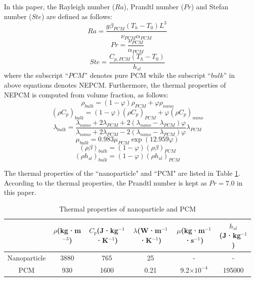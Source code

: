 \documentclass[preprint,12pt]{elsarticle}
\begin{document}
In this paper, the Rayleigh number ($Ra$), Prandtl number ($Pr$) and Stefan number ($Ste$) are defined as follows:
\begin{equation}
	Ra = \frac{{g\beta_{PCM} \left( {T_h - {T_0}} \right){L^3}}}{{\nu_{PCM} \alpha_{PCM} }}
\end{equation}
\begin{equation}
	Pr=\frac{\nu_{PCM}}{\alpha_{PCM}}
\end{equation}
\begin{equation}
	Ste=\frac{C_{p,PCM}(T_h-T_0)}{h_{sl}}
\end{equation}
where the subscript $ “PCM” $ denotes pure PCM while the subscript “$bulk$” in above equations denotes NEPCM. Furthermore, the thermal properties of NEPCM is computed from volume fraction, as follows\cite{RN1173,RN1065,RN1174}:
\begin{equation}
	{\rho _{bulk}} = \left( {1 - \varphi } \right){\rho _{PCM}} + \varphi {\rho _{nano}}
\end{equation}
\begin{equation}
	{\left( {\rho {C_p}} \right)_{bulk}} = \left( {1 - \varphi } \right){\left( {\rho {C_p}} \right)_{PCM}} + \varphi {\left( {\rho {C_p}} \right)_{nano}}
\end{equation}
\begin{equation}
	{\lambda _{bulk}} = \frac
	{\lambda _{nano} + 2\lambda _{PCM} + 2\left( \lambda _{nano}- \lambda _{PCM} \right)\varphi }
	{\lambda _{nano} + 2\lambda _{PCM} - 2\left( \lambda _{nano} - \lambda _{PCM} \right)\varphi }
	\lambda _{PCM}
\end{equation}
\begin{equation}
	{\mu _{bulk}} = 0.983{\mu _{PCM}}\exp \left( {12.959\varphi } \right)
\end{equation}
\begin{equation}
	{\left( {\rho \beta } \right)_{bulk}} = \left( {1 - \varphi } \right){\left( {\rho \beta } \right)_{PCM}}
\end{equation}
\begin{equation}
	{\left( {\rho h_{sl} } \right)_{bulk}} = \left( {1 - \varphi } \right){\left( {\rho h_{sl} } \right)_{PCM}}
\end{equation}
	    
	The thermal properties of the ``nanoparticle" and ``PCM" are listed in Table \ref{Thermal_Properties}. According to the thermal properties, the Prandtl number is kept as $Pr=7.0$ in this paper.
	
	\begin{table}[H]
		\centering
		\footnotesize
		\caption{Thermal properties of nanoparticle and PCM}
		\begin{tabular}{cccccc}
			\toprule
			& $\rho$(kg·m$^{-3}$) & $C_p$(J·kg$^{-1}$·K$^{-1}$) & $\lambda$(W·m$^{-1}$·K$^{-1}$) & $\mu$(kg·m$^{-1}$·s$^{-1}$) & $h_{sl}$(J·kg$^{-1}$) \\
			\midrule
			Nanoparticle & 3880 & 765  & 25   & -      & - \\
			PCM          & 930  & 1600 & 0.21 & 9.2$\times10^{-4}$ & 195000 \\
			\bottomrule
		\end{tabular}
		\label{Thermal_Properties}		
	\end{table}
	
\end{document}
